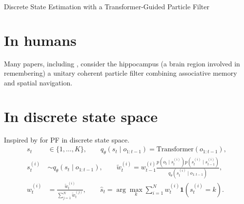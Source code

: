\begin{frame}[allowframebreaks]{Discrete State Estimation with a Transformer-Guided Particle Filter}
    \section{In humans}
        Many papers, including \cite{fox-2010-learning-in-a-unitary-coherent-hippocampus}, consider the hippocampus (a brain region involved in remembering) a unitary coherent particle filter combining associative memory and spatial navigation.
        
        \section{In discrete state space}
        Inspired by \cite{chopin-2001-sequential-inference-and-state-number-determination-for-discrete-state-space-models-through-particle-filtering} for PF in discrete state space.
        \[
            \begin{aligned}
                s_t
                &\in
                \{1,\ldots,K\},
                \qquad
                q_{\theta}(s_t \mid o_{1:t-1})
                =
                \mathrm{Transformer}(o_{1:t-1}),
                \\[4pt]
                s_t^{(i)}
                &\sim
                q_{\theta}(s_t \mid o_{1:t-1}),
                \qquad
                \tilde{w}_t^{(i)}
                =
                w_{t-1}^{(i)}
                \frac{
                    p(o_t \mid s_t^{(i)})
                    p(s_t^{(i)} \mid s_{t-1}^{(i)})
                }{
                    q_{\theta}(s_t^{(i)} \mid o_{1:t-1})
                },
                \\[4pt]
                w_t^{(i)}
                &=
                \frac{
                    \tilde{w}_t^{(i)}
                }{
                    \sum_{j=1}^{N}\tilde{w}_t^{(j)}
                },
                \qquad
                \hat{s}_t
                =
                \arg\max_{k}
                \sum_{i=1}^{N}
                w_t^{(i)}
                \mathbf{1}
                \left(
                    s_t^{(i)}=k
                \right).
            \end{aligned}
        \]
        

\end{frame}
